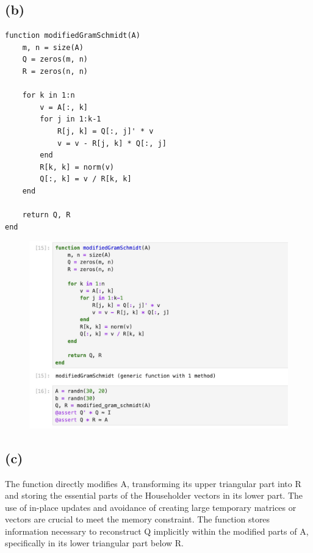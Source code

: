 \documentclass{article}
\begin{document}
\subsection{(b)}
\begin{verbatim}
function modifiedGramSchmidt(A)
    m, n = size(A)
    Q = zeros(m, n)
    R = zeros(n, n)

    for k in 1:n
        v = A[:, k]
        for j in 1:k-1
            R[j, k] = Q[:, j]' * v
            v = v - R[j, k] * Q[:, j]
        end
        R[k, k] = norm(v)
        Q[:, k] = v / R[k, k]
    end

    return Q, R
end

\end{verbatim}
\begin{figure}[H]
    \centering
    \includegraphics[width=0.75\linewidth]{Image 3-5-24 at 01.01.jpeg}
    
    
\end{figure}
\subsection{(c)}
The function directly modifies A, transforming its upper triangular part into R and storing the essential parts of the Householder vectors in its lower part. The use of in-place updates and avoidance of creating large temporary matrices or vectors are crucial to meet the memory constraint.
The function stores information necessary to reconstruct Q implicitly within the modified parts of A, specifically in its lower triangular part below R.
\end{document}
